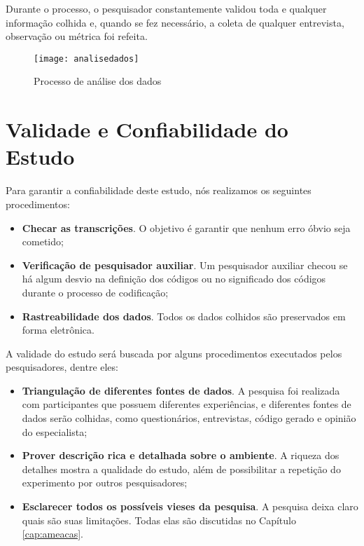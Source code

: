 Durante o processo, o pesquisador constantemente validou toda e qualquer
informação colhida e, quando se fez necessário, a coleta de qualquer entrevista,
observação ou métrica foi refeita. 

\begin{figure}
  \centering
  \texttt{[image: analisedados]}
  \caption{Processo de análise dos dados}
  \label{fig:analise-dados}
\end{figure}

\section{Validade e Confiabilidade do Estudo}
\label{sec:planejamento-validacao}

Para garantir a confiabilidade deste estudo, nós realizamos os
seguintes procedimentos:

\begin{itemize}
	\item \textbf{Checar as transcrições}. O objetivo é garantir que nenhum erro
	óbvio seja cometido;

	\item \textbf{Verificação de pesquisador auxiliar}. Um pesquisador auxiliar
	checou se há algum desvio na definição dos códigos ou no significado dos códigos 
	durante o processo de codificação;
	
	\item \textbf{Rastreabilidade dos dados}. Todos os dados colhidos são
	preservados em forma eletrônica.

\end{itemize}

A validade do estudo será buscada por alguns procedimentos executados pelos
pesquisadores, dentre eles:

\begin{itemize}
	\item \textbf{Triangulação de diferentes fontes de dados}. A pesquisa foi
	realizada com participantes que possuem diferentes experiências, e diferentes
	fontes de dados serão colhidas, como questionários, entrevistas, código gerado e 
	opinião do especialista;

	\item \textbf{Prover descrição rica e detalhada sobre o ambiente}. A riqueza
	dos detalhes mostra a qualidade do estudo, além de possibilitar a repetição do
	experimento por outros pesquisadores;

	\item \textbf{Esclarecer todos os possíveis vieses da pesquisa}. A pesquisa
	deixa claro quais são suas limitações. Todas elas são discutidas no Capítulo
	\ref{cap:ameacas}.

\end{itemize}

